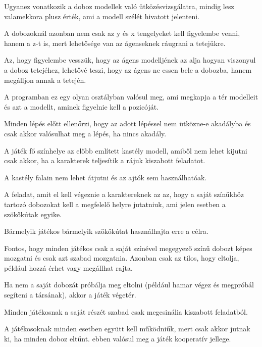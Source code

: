 Ugyanez vonatkozik a doboz modellek való ütközésvizsgálatra, mindig lesz valamekkora plusz érték, ami a modell szélét hivatott jelenteni.

A dobozoknál azonban nem csak az y és x tengelyeket kell figyelembe venni, hanem a z-t is, mert lehetősége van az ágenseknek ráugrani a tetejükre. 

Az, hogy figyelembe vesszük, hogy az ágens modelljének az alja hogyan viszonyul a doboz tetejéhez, lehetővé teszi, hogy az ágens ne essen bele a dobozba, hanem megálljon annak a tetején.

A programban ez egy olyan osztályban valósul meg, ami megkapja a tér modelleit és azt a modellt, aminek figyelnie kell a pozicóját.
 
Minden lépés előtt ellenőrzi, hogy az adott lépéssel nem ütközne-e akadályba és csak akkor valósulhat meg a lépés, ha nincs akadály.



A játék fő színhelye az előbb említett kastély modell, amiből nem lehet kijutni csak akkor, ha a karakterek teljesítik a rájuk kiszabott feladatot.

A kastély falain nem lehet átjutni és az ajtók sem használhatóak.

A feladat, amit el kell végeznie a karaktereknek az az, hogy a saját színűkhöz tartozó dobozokat kell a megfelelő helyre jutatniuk, ami jelen esetben a szökőkútak egyike. 

Bármelyik játékos bármelyik szökőkútat használhajta erre a célra.

Fontos, hogy minden játékos csak a saját színével megegyező színű dobozt képes mozgatni és csak azt szabad mozgatnia. Azonban csak az tilos, hogy eltolja, például hozzá érhet vagy megállhat rajta. 

Ha nem a saját dobozát próbálja meg eltolni (például hamar végez és megpróbál segíteni a társának), akkor a játék végetér.

Minden játékosnak a saját részét szabad csak megcsinália  kiszabott feladatból. 

A játékosoknak minden esetben együtt kell működniűk, mert csak akkor jutnak ki, ha minden doboz eltűnt. ebben valósul meg a játék kooperatív jellege. 

